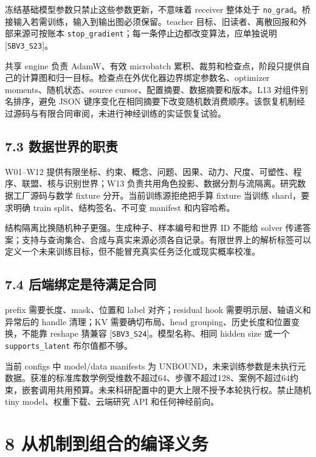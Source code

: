 \documentclass[
  10pt,
]{article}
\begin{document}
冻结基础模型参数只禁止这些参数更新，不意味着 receiver 整体处于
\nolinkurl{no_grad}。桥接输入若需训练，输入到输出图必须保留。teacher
目标、旧读者、离散回报和外部来源可按账本
\nolinkurl{stop_gradient}；每一条停止边都改变算法，应单独说明
{[}\nolinkurl{SBV3_S23}{]}。

共享 engine 负责 AdamW、有效 microbatch
累积、裁剪和检查点，阶段只提供自己的计算图和归一目标。检查点在外优化器边界绑定参数名、optimizer
moments、随机状态、source cursor、配置摘要、数据摘要和版本。L13
对组件别名排序，避免 JSON
键序变化在相同摘要下改变随机数消费顺序。该恢复机制经过源码与有限合同审阅，未进行神经训练的实证恢复试验。

\subsection{7.3
数据世界的职责}\label{ux6570ux636eux4e16ux754cux7684ux804cux8d23}

W01--W12
提供有限坐标、约束、概念、问题、因果、动力、尺度、可塑性、程序、联盟、核与识别世界；W13
负责共用角色投影、数据分割与流隔离。研究数据工厂源码与数学 fixture
分开。当前训练源拒绝把手算 fixture 当训练 shard，要求明确 train
split、结构签名、不可变 manifest 和内容哈希。

结构隔离比换随机种子更强。生成种子、样本编号和世界 ID 不能给 solver
传递答案；支持与查询集合、合成与真实来源必须各自记录。有限世界上的解析标签可以定义一个未来训练目标，但不能冒充真实任务泛化或现实概率校准。

\subsection{7.4
后端绑定是待满足合同}\label{ux540eux7aefux7ed1ux5b9aux662fux5f85ux6ee1ux8db3ux5408ux540c}

prefix 需要长度、mask、位置和 label 对齐；residual hook
需要明示层、轴语义和异常后的 handle 清理；KV 需要确切布局、head
grouping、历史长度和位置变换，不能靠 reshape 猜兼容
{[}\nolinkurl{SBV3_S24}{]}。模型名称、相同 hidden size 或一个
\nolinkurl{supports_latent} 布尔值都不够。

当前 configs 中 model/data manifests 为
UNBOUND，未来训练参数是未执行元数据。获准的标准库数学例受维数不超过64、步骤不超过128、案例不超过64约束，嵌套调用共用预算。未来科研配置中的更大上限不授予本轮执行权。禁止随机
tiny model、权重下载、云端研究 API 和任何神经前向。

\section{8
从机制到组合的编译义务}\label{ux4eceux673aux5236ux5230ux7ec4ux5408ux7684ux7f16ux8bd1ux4e49ux52a1}
\end{document}
